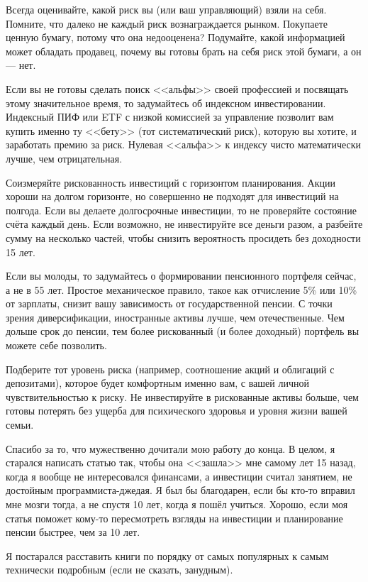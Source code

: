 Всегда оценивайте, какой риск вы (или ваш управляющий) взяли на себя. Помните, 
что далеко не каждый риск вознаграждается рынком. Покупаете ценную бумагу, 
потому что она недооценена? Подумайте, какой информацией может обладать 
продавец, почему вы готовы брать на себя риск этой бумаги, а он --- нет.

Если вы не готовы сделать поиск <<альфы>> своей профессией и посвящать этому
значительное время, то задумайтесь об индексном инвестировании. Индексный ПИФ 
или ETF с низкой комиссией за управление позволит вам купить именно ту <<бету>> 
(тот систематический риск), которую вы хотите, и заработать премию за риск. 
Нулевая <<альфа>> к индексу чисто математически лучше, чем отрицательная.

Соизмеряйте рискованность инвестиций с горизонтом планирования. Акции хороши на 
долгом горизонте, но совершенно не подходят для инвестиций на полгода. Если вы 
делаете долгосрочные инвестиции, то не проверяйте состояние счёта каждый день. 
Если возможно, не инвестируйте все деньги разом, а разбейте сумму на несколько 
частей, чтобы снизить вероятность просидеть без доходности 15 лет.

Если вы молоды, то задумайтесь о формировании пенсионного портфеля сейчас, а не 
в 55 лет. Простое механическое правило, такое как отчисление 5\% или 10\% от 
зарплаты, снизит вашу зависимость от государственной пенсии. С точки зрения 
диверсификации, иностранные активы лучше, чем отечественные. Чем дольше срок
до пенсии, тем более рискованный (и более доходный) портфель вы можете себе 
позволить.

Подберите тот уровень риска (например, соотношение акций и облигаций с 
депозитами), которое будет комфортным именно вам, с вашей личной 
чувствительностью к риску. Не инвестируйте в рискованные активы больше, чем 
готовы потерять без ущерба для психического здоровья и уровня жизни вашей семьи.

Спасибо за то, что мужественно дочитали мою работу до конца. В целом, я старался 
написать статью так, чтобы она <<зашла>> мне самому лет 15 назад, когда я вообще 
не интересовался финансами, а инвестиции считал занятием, не достойным 
программиста-джедая. Я был бы благодарен, если бы кто-то вправил мне мозги 
тогда, а не спустя 10 лет, когда я пошёл учиться. Хорошо, если моя статья
поможет кому-то пересмотреть взгляды на инвестиции и планирование пенсии 
быстрее, чем за 10 лет.


Я постарался расставить книги по порядку от самых популярных к самым технически 
подробным (если не сказать, занудным).

